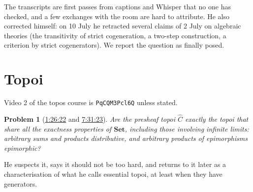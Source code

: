 \documentclass[11pt,a4paper]{amsart}
\newtheorem{problem}{Problem}
\theoremstyle{definition}
\theoremstyle{remark}
\newcommand{\ts}[3]{\href{https://www.youtube.com/watch?v=#1&t=#2}{#3}}
\newcommand{\Set}{\mathbf{Set}}
\begin{document}
The transcripts are first passes from captions and Whisper that no one has checked, and a few exchanges with the room are hard to attribute. He also corrected himself: on 10 July he retracted several claims of 2 July on algebraic theories (the transitivity of strict cogeneration, a two-step construction, a criterion by strict cogenerators). We report the question as finally posed.

\section{Topoi}

Video 2 of the topos course is \texttt{PqCQM3Pcl6Q} unless stated.

\begin{problem}[\ts{PqCQM3Pcl6Q}{1h26m22s}{1:26:22} and \ts{PqCQM3Pcl6Q}{7h31m23s}{7:31:23}]\label{p:presheaf}
Are the presheaf topoi $\widehat C$ exactly the topoi that share all the exactness properties of $\Set$, including those involving infinite limits: arbitrary sums and products distributive, and arbitrary products of epimorphisms epimorphic?
\end{problem}
He suspects it, says it should not be too hard, and returns to it later as a characterisation of what he calls essential topoi, at least when they have generators.
\end{document}
